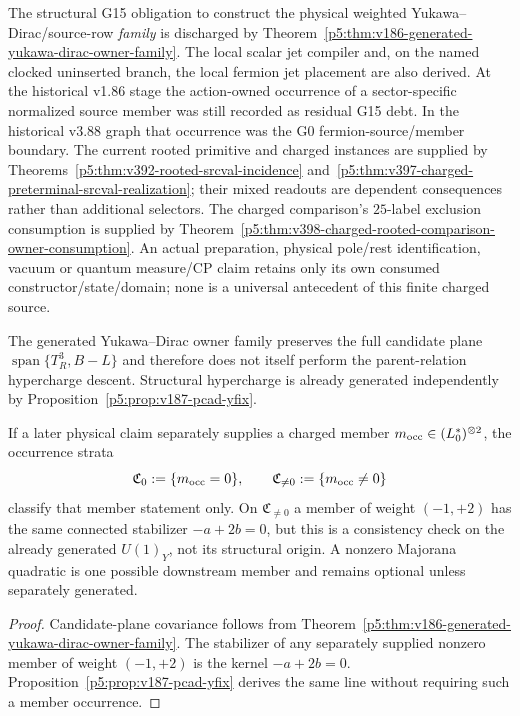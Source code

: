 \documentclass[12pt,a4paper]{article}
\begin{document}
\begin{corollary}
\label{p5:cor:v186-g15-owner-family-split}
The structural G15 obligation to construct the physical weighted
Yukawa--Dirac/source-row \emph{family} is discharged by
Theorem~\ref{p5:thm:v186-generated-yukawa-dirac-owner-family}.  The local
scalar jet compiler and, on the named clocked uninserted branch, the local
fermion jet placement are also derived.  At the historical v1.86 stage the action-owned occurrence of a sector-specific
normalized source member was still recorded as residual G15 debt.  In the
historical v3.88 graph that occurrence was the G0 fermion-source/member
boundary. The current rooted primitive and charged instances are supplied by
Theorems~\ref{p5:thm:v392-rooted-srcval-incidence}
and~\ref{p5:thm:v397-charged-preterminal-srcval-realization}; their mixed
readouts are dependent consequences rather than additional selectors.
The charged comparison's $25$-label exclusion consumption is supplied by
Theorem~\ref{p5:thm:v398-charged-rooted-comparison-owner-consumption}.
An actual preparation, physical pole/rest identification, vacuum or quantum
measure/CP claim retains only its own consumed constructor/state/domain;
none is a universal antecedent of this finite charged source.
\end{corollary}

\begin{proposition}
\label{p5:prop:v186-abelian-pointing-strata}
The generated Yukawa--Dirac owner family preserves the full candidate plane
\(\operatorname{span}\{T_R^3,B-L\}\) and therefore does not itself perform
the parent-relation hypercharge descent.  Structural hypercharge is already
generated independently by Proposition~\ref{p5:prop:v187-pcad-yfix}.

If a later physical claim separately supplies a charged member
\(m_{\rm occ}\in(L_0^*)^{\otimes2}\), the occurrence strata
\[
 \mathfrak C_0:=\{m_{\rm occ}=0\},\qquad
 \mathfrak C_{\ne0}:=\{m_{\rm occ}\ne0\}
\]
classify that member statement only.  On \(\mathfrak C_{\ne0}\) a member of
weight \((-1,+2)\) has the same connected stabilizer
\(-a+2b=0\), but this is a consistency check on the already generated
\(U(1)_Y\), not its structural origin.  A nonzero Majorana quadratic is one
possible downstream member and remains optional unless separately generated.
\end{proposition}
\begin{proof}
Candidate-plane covariance follows from
Theorem~\ref{p5:thm:v186-generated-yukawa-dirac-owner-family}.  The stabilizer
of any separately supplied nonzero member of weight \((-1,+2)\) is the kernel
\(-a+2b=0\).  Proposition~\ref{p5:prop:v187-pcad-yfix} derives the same line
without requiring such a member occurrence.
\end{proof}
\end{document}

